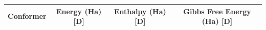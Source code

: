 \usepackage{siunitx}
\begin{table}[h!]
\centering
\begin{tabular}{l S[table-format=-3.4] S[table-format=-3.4] S[table-format=-3.4]}
\toprule
Conformer & {Energy (Ha) [D]} & {Enthalpy (Ha) [D]} & {Gibbs Free Energy (Ha) [D]} \\
\midrule
\bottomrule
\end{tabular}
\end{table}